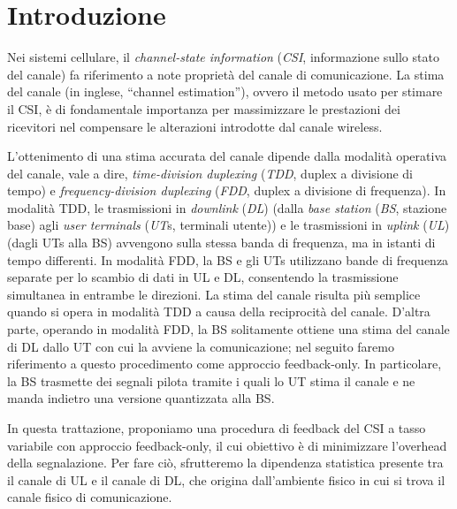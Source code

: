 \chapter{Introduzione}

\thispagestyle{empty}

\vspace{9.6pt}  %

Nei sistemi cellulare, il \textit{channel-state information} (\textit{CSI},
informazione sullo stato del canale) fa riferimento a note proprietà del canale
di comunicazione. La stima del canale (in inglese, ``channel estimation''),
ovvero il metodo usato per stimare il CSI, è di fondamentale importanza per
massimizzare le prestazioni dei ricevitori nel compensare le alterazioni
introdotte dal canale wireless.

L'ottenimento di una stima accurata del canale dipende dalla modalità operativa
del canale, vale a dire, \textit{time-division duplexing} (\textit{TDD}, duplex
a divisione di tempo) e \textit{frequency-division duplexing} (\textit{FDD},
duplex a divisione di frequenza). In modalità TDD, le trasmissioni in
\textit{downlink} (\textit{DL}) (dalla \textit{base station} (\textit{BS},
stazione base) agli \textit{user terminals} (\textit{UT}s, terminali utente)) e
le trasmissioni in \textit{uplink} (\textit{UL}) (dagli UTs alla BS) avvengono
sulla stessa banda di frequenza, ma in istanti di tempo differenti. In modalità
FDD, la BS e gli UTs utilizzano bande di frequenza separate per lo scambio di
dati in UL e DL, consentendo la trasmissione simultanea in entrambe le
direzioni. La stima del canale risulta più semplice quando si opera in modalità
TDD a causa della reciprocità del canale. D'altra parte, operando in modalità
FDD, la BS solitamente ottiene una stima del canale di DL dallo UT con cui la
avviene la comunicazione; nel seguito faremo riferimento a questo procedimento
come approccio feedback-only.  In particolare, la BS trasmette dei segnali
pilota tramite i quali lo UT stima il canale e ne manda indietro una versione
quantizzata alla BS.

In questa trattazione, proponiamo una procedura di feedback del CSI a tasso
variabile con approccio feedback-only, il cui obiettivo è di minimizzare
l'overhead della segnalazione. Per fare ciò, sfrutteremo la dipendenza
statistica presente tra il canale di UL e il canale di DL, che origina
dall'ambiente fisico in cui si trova il canale fisico di comunicazione.


